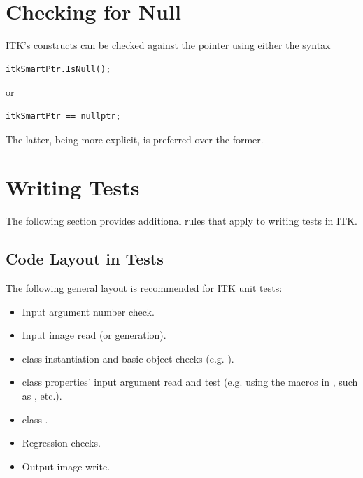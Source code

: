 \section{Checking for Null}%
\label{sec:CheckingForNull}

ITK's  constructs can be checked against the 
pointer using either the syntax

\small
\begin{verbatim}
itkSmartPtr.IsNull();
\end{verbatim}
\normalsize

or

\small
\begin{verbatim}
itkSmartPtr == nullptr;
\end{verbatim}
\normalsize

The latter, being more explicit, is preferred over the former.

\section{Writing Tests}%
\label{sec:WritingTests}

The following section provides additional rules that apply to writing tests
in ITK.


\subsection{Code Layout in Tests}%
\label{subsec:CodeLayoutInTests}

The following general layout is recommended for ITK unit tests:
\begin{itemize}
\item Input argument number check.
\item Input image read (or generation).
\item {} class instantiation and basic object checks (e.g.
).
\item {} class properties' input argument read and test (e.g. using the
macros in , such as , etc.).
\item {} class .
\item Regression checks.
\item Output image write.
\end{itemize}


